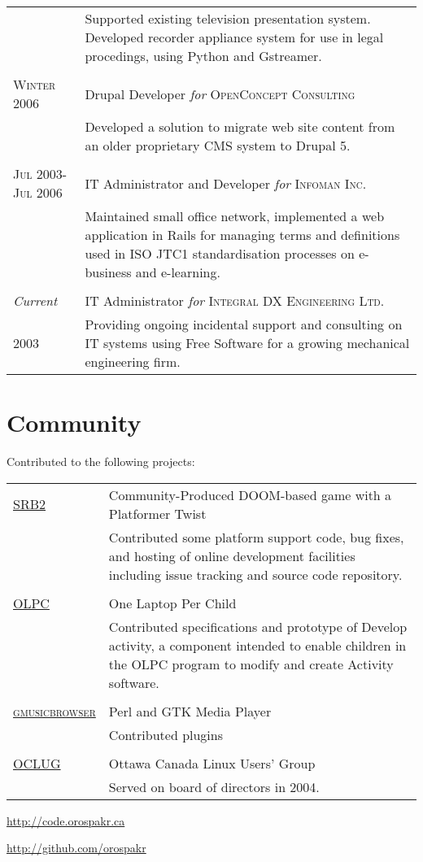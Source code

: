 \documentclass[letterpaper,10pt]{article}
\begin{document}
\begin{longtable}{p{3cm}|p{12cm}}
   & \footnotesize{Supported existing television presentation system.  Developed recorder appliance system for use in legal procedings, using Python and Gstreamer.} \\
  \multicolumn{2}{c}{} \\
  \textsc{Winter 2006} & Drupal Developer \emph{for} \textsc{OpenConcept Consulting} \\
   & \footnotesize{Developed a solution to migrate web site content from an older proprietary CMS system to Drupal 5.} \\
  \multicolumn{2}{c}{} \\
  \textsc{Jul 2003-Jul 2006} & IT Administrator and Developer \emph{for} \textsc{Infoman Inc.} \\
   & \footnotesize{Maintained small office network, implemented a web application in Rails for managing terms and definitions used in ISO JTC1 standardisation processes on e-business and e-learning.} \\
  \multicolumn{2}{c}{} \\
  \emph{Current} & IT Administrator \emph{for} \textsc{Integral DX Engineering Ltd.} \\
   \textsc{2003} & \footnotesize{Providing ongoing incidental support and consulting on IT systems using Free Software for a growing mechanical engineering firm.} \\

\end{longtable}

\section{Community}
Contributed to the following projects:

\begin{longtable}{p{3cm}|p{12cm}}
  \textsc{\href{http://www.srb2.org}{SRB2}} & Community-Produced DOOM-based game with a Platformer Twist \\
   & \footnotesize{Contributed some platform support code, bug fixes, and hosting of online development facilities including issue tracking and source code repository.} \\
  \multicolumn{2}{c}{} \\
  \textsc{\href{http://www.laptop.org}{OLPC}} & One Laptop Per Child \\
   & \footnotesize{Contributed specifications and prototype of Develop activity, a component intended to enable children in the OLPC program to modify and create Activity software.} \\
  \multicolumn{2}{c}{} \\
  \textsc{\href{http://www.gmusicbrowser.org}{gmusicbrowser}} & Perl and GTK Media Player \\
   & \footnotesize{Contributed plugins} \\
  \multicolumn{2}{c}{} \\
  \textsc{\href{http://www.oclug.on.ca}{OCLUG}} & Ottawa Canada Linux Users' Group \\
   & \footnotesize{Served on board of directors in 2004.}
\end{longtable}

\href{http://code.orospakr.ca}{http://code.orospakr.ca}

\href{http://github.com/orospakr}{http://github.com/orospakr}
\end{document}
